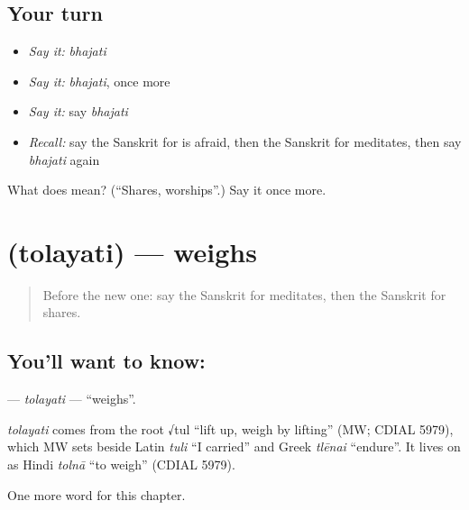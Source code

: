 \subsection*{Your turn}
\begin{itemize}
\raggedright
  \item \emph{Say it:} \emph{bhajati}
  \item \emph{Say it:} \emph{bhajati}, once more
  \item \emph{Say it:} say \emph{bhajati}
  \item \emph{Recall:} say the Sanskrit for is afraid, then the Sanskrit for meditates, then say \emph{bhajati} again
\end{itemize}

\begin{tcolorbox}[breakable,colback=teal!4,colframe=teal!35!black,title={Before you move on}]
What does  mean? (\textquotedblleft{}Shares, worships\textquotedblright{}.) Say it once more.
\end{tcolorbox}
\section[\texorpdfstring{\sk{तोलयति} (tolayati)}{तोलयति (tolayati)}]{ (tolayati) — weighs}

\label{lesson:SA-C144-tolayati}



\begin{quote}
Before the new one: say the Sanskrit for meditates, then the Sanskrit for shares.
\end{quote}

\subsection*{You'll want to know: }
\textbf{} — \emph{tolayati} — \textquotedblleft{}weighs\textquotedblright{}.

\begin{cousinweb}
\emph{tolayati} comes from the root √tul \textquotedblleft{}lift up, weigh by lifting\textquotedblright{} (MW; CDIAL 5979), which MW sets beside Latin \emph{tuli} \textquotedblleft{}I carried\textquotedblright{} and Greek \emph{tlēnai} \textquotedblleft{}endure\textquotedblright{}. It lives on as Hindi \emph{tolnā} \textquotedblleft{}to weigh\textquotedblright{} (CDIAL 5979).
\end{cousinweb}

\begin{grammarlens}[title={What you've built}]
One more word for this chapter.
\end{grammarlens}


